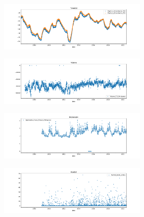 \documentclass{article}
\begin{document}
\begin{figure}[p]
     \centering
     \begin{subfigure}
         \centering
         \includegraphics[width=0.8\textwidth]{figs/Aquifer_Petrignano_target.pdf}
     \end{subfigure}
% 
     \begin{subfigure}
         \centering
         \includegraphics[width=0.8\textwidth]{figs/Aquifer_Petrignano_Volume.pdf}
     \end{subfigure}
% 
     \begin{subfigure}
         \centering
         \includegraphics[width=0.8\textwidth]{figs/Aquifer_Petrignano_Hydrometry.pdf}
     \end{subfigure}
%
     \begin{subfigure}
         \centering
         \includegraphics[width=0.8\textwidth]{figs/Aquifer_Petrignano_Rainfall.pdf}
     \end{subfigure}
%
     \begin{subfigure}
         \centering

\end{subfigure}
\end{figure}
\end{document}
